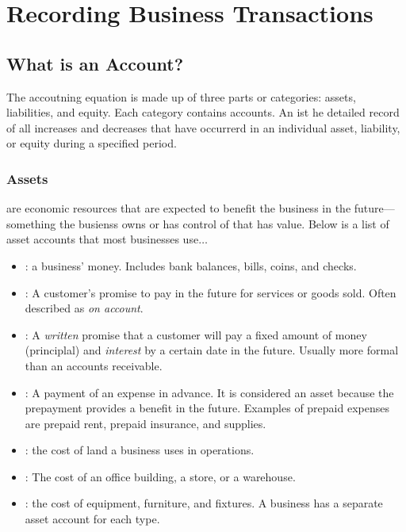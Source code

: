 \documentclass{article}
\begin{document}
\section{Recording Business Transactions}

\subsection{What is an Account?}

The accoutning equation is made up of three parts or categories: assets, liabilities, and equity. Each category contains accounts. An  ist he detailed record of all increases and decreases that have occurrerd in an individual asset, liability, or equity during a specified period.

\subsubsection{Assets}

 are economic resources that are expected to benefit the business in the future---something the busienss owns or has control of that has value. Below is a list of asset accounts that most businesses use$\dots$ 
\begin{itemize}
  \item {}: a business' money. Includes bank balances, bills, coins, and checks. 
  \item {}: A customer's promise to pay in the future for services or goods sold. Often described as \emph{on account}. 
  \item {}: A \emph{written} promise that a customer will pay a fixed amount of money (principlal) and \emph{interest} by a certain date in the future. Usually more formal than an accounts receivable. 
  \item {}: A payment of an expense in advance. It is considered an asset because the prepayment provides a benefit in the future. Examples of prepaid expenses are prepaid rent, prepaid insurance, and supplies. 
  \item {}: the cost of land a business uses in operations. 
  \item {}: The cost of an office building, a store, or a warehouse. 
  \item {}: the cost of equipment, furniture, and fixtures. A business has a separate asset account for each type. 
\end{itemize}
\end{document}
